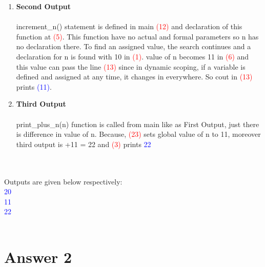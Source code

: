 \documentclass{article}
\begin{document}
\begin{enumerate}[label=\textbf{\alph*)}]
\begin{enumerate}[label=\textbf{\alph*)}]
    
    \item \textbf{Second Output} \\~\\
    increment\_n() statement is defined in main \textcolor{red}{(12)} and declaration of this function at \textcolor{red}{(5)}. This function have no actual and formal parameters so n has no declaration there. To find an assigned value, the search continues and a declaration for  n is found with 10 in \textcolor{red}{(1)}. value of n becomes 11 in \textcolor{red}{(6)} and this value can pass the line \textcolor{red}{(13)} since in dynamic scoping, if a variable is defined and assigned at any time, it changes in everywhere. So cout in \textcolor{red}{(13)} prints \textcolor{blue}{(11)}.
    
    \item \textbf{Third Output} 
    \\~\\ 
    print\_plus\_n(n) function is called from main like as First Output, just there is difference in value of n. Because, \textcolor{red}{(23)} sets global value of n to 11, moreover third output is +11 = 22 and \textcolor{red}{(3)} prints \textcolor{blue}{22}
    \end{enumerate}
    \\~\\ Outputs are given below respectively: \\ \textcolor{blue}{20} \\ \textcolor{blue}{11} \\ \textcolor{blue}{22} \\~\\
\end{enumerate}


\section*{Answer 2}
\end{document}
